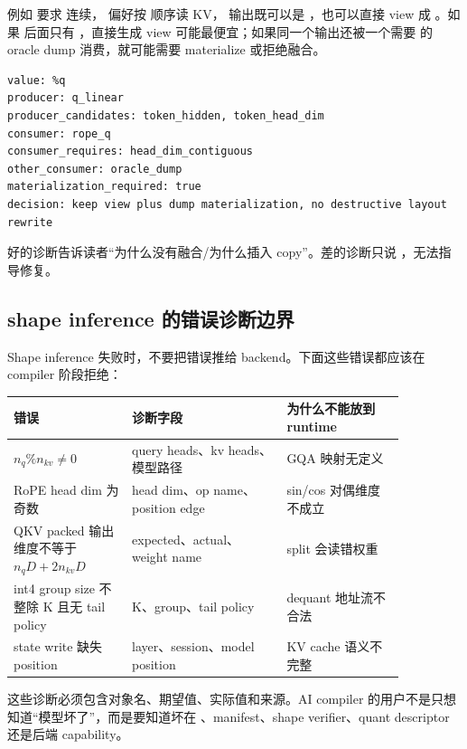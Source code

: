 例如  要求  连续， 偏好按  顺序读 KV， 输出既可以是 ，也可以直接 view 成 。如果  后面只有 ，直接生成  view 可能最便宜；如果同一个输出还被一个需要  的 oracle dump 消费，就可能需要 materialize 或拒绝融合。

\begin{lstlisting}[numbers=none,caption={layout conflict 诊断应包含的字段}]
value: %q
producer: q_linear
producer_candidates: token_hidden, token_head_dim
consumer: rope_q
consumer_requires: head_dim_contiguous
other_consumer: oracle_dump
materialization_required: true
decision: keep view plus dump materialization, no destructive layout rewrite
\end{lstlisting}

好的诊断告诉读者“为什么没有融合/为什么插入 copy”。差的诊断只说 ，无法指导修复。

\subsection{shape inference 的错误诊断边界}

Shape inference 失败时，不要把错误推给 backend。下面这些错误都应该在 compiler 阶段拒绝：

\begin{center}
\begin{tabular}{p{0.26\linewidth}p{0.34\linewidth}p{0.26\linewidth}}
\toprule
错误 & 诊断字段 & 为什么不能放到 runtime \\
\midrule
\(n_q \% n_{kv} \ne 0\) & query heads、kv heads、模型路径 & GQA 映射无定义 \\
RoPE head dim 为奇数 & head dim、op name、position edge & sin/cos 对偶维度不成立 \\
QKV packed 输出维度不等于 \(n_qD+2n_{kv}D\) & expected、actual、weight name & split 会读错权重 \\
int4 group size 不整除 K 且无 tail policy & K、group、tail policy & dequant 地址流不合法 \\
state write 缺失 position & layer、session、model position & KV cache 语义不完整 \\
\bottomrule
\end{tabular}
\end{center}

这些诊断必须包含对象名、期望值、实际值和来源。AI compiler 的用户不是只想知道“模型坏了”，而是要知道坏在 、manifest、shape verifier、quant descriptor 还是后端 capability。

